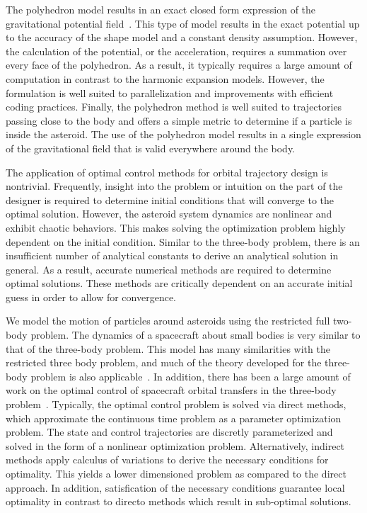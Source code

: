 \documentclass[]{aiaa-tc}%
\begin{document}
The polyhedron model results in an exact closed form expression of the gravitational potential field~\cite{werner1994,werner1996}.
This type of model results in the exact potential up to the accuracy of the shape model and a constant density assumption.
However, the calculation of the potential, or the acceleration, requires a summation over every face of the polyhedron. 
As a result, it typically requires a large amount of computation in contrast to the harmonic expansion models. 
However, the formulation is well suited to parallelization and improvements with efficient coding practices. 
Finally, the polyhedron method is well suited to trajectories passing close to the body and offers a simple metric to determine if a particle is inside the asteroid.
The use of the polyhedron model results in a single expression of the gravitational field that is valid everywhere around the body.

The application of optimal control methods for orbital trajectory design is nontrivial.
Frequently, insight into the problem or intuition on the part of the designer is required to determine initial conditions that will converge to the optimal solution.
However, the asteroid system dynamics are nonlinear and exhibit chaotic behaviors.
This makes solving the optimization problem highly dependent on the initial condition.
Similar to the three-body problem, there is an insufficient number of analytical constants to derive an analytical solution in general.
As a result, accurate numerical methods are required to determine optimal solutions.
These methods are critically dependent on an accurate initial guess in order to allow for convergence.

We model the motion of particles around asteroids using the restricted full two-body problem.
The dynamics of a spacecraft about small bodies is very similar to that of the three-body problem.
This model has many similarities with the restricted three body problem, and much of the theory developed for the three-body problem is also applicable~\cite{mondelo2010,herrera2014}.
In addition, there has been a large amount of work on the optimal control of spacecraft orbital transfers in the three-body problem~\cite{mingotti2011,grebow2011}.
Typically, the optimal control problem is solved via direct methods, which approximate the continuous time problem as a parameter optimization problem.
The state and control trajectories are discretly parameterized and solved in the form of a nonlinear optimization problem.
Alternatively, indirect methods apply calculus of variations to derive the necessary conditions for optimality. 
This yields a lower dimensioned problem as compared to the direct approach.
In addition, satisfication of the necessary conditions guarantee local optimality in contrast to directo methods which result in sub-optimal solutions.
\end{document}
